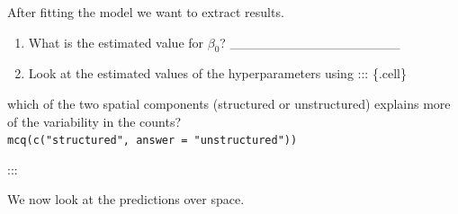 \documentclass[
  letterpaper,
  DIV=11,
  numbers=noendperiod]{scrartcl}
\newenvironment{Shaded}{\begin{snugshade}}{\end{snugshade}}
\newcommand{\NormalTok}[1]{\textcolor[rgb]{0.00,0.23,0.31}{#1}}
\newcommand{\SpecialCharTok}[1]{\textcolor[rgb]{0.37,0.37,0.37}{#1}}
\begin{document}
After fitting the model we want to extract results.

\begin{tcolorbox}[enhanced jigsaw, opacityback=0, bottomtitle=1mm, opacitybacktitle=0.6, titlerule=0mm, left=2mm, bottomrule=.15mm, colframe=quarto-callout-tip-color-frame, rightrule=.15mm, toprule=.15mm, title={Question}, colbacktitle=quarto-callout-tip-color!10!white, leftrule=.75mm, colback=white, breakable, arc=.35mm, toptitle=1mm, coltitle=black]

\begin{enumerate}
\def\labelenumi{\arabic{enumi}.}
\item
  What is the estimated value for \(\beta_0\)?
  \_\_\_\_\_\_\_\_\_\_\_\_\_\_\_\_\_\_
\item
  Look at the estimated values of the hyperparameters using :::
  \{.cell\}
\end{enumerate}

\begin{Shaded}
\end{Shaded}

\end{tcolorbox}

which of the two spatial components (structured or unstructured)
explains more of the variability in the counts?
\texttt{mcq(c("structured",\ answer\ =\ "unstructured"))}

:::

We now look at the predictions over space.
\end{document}
